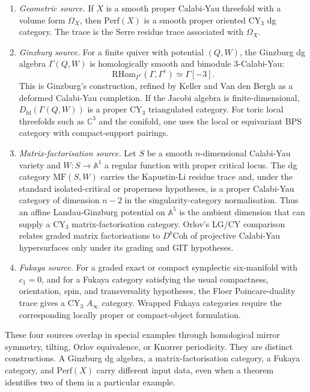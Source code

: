 \documentclass[11pt]{amsart}
\newcommand{\Perf}{\mathrm{Perf}}
\newcommand{\Dfd}{D_{\mathrm{fd}}}
\newcommand{\Db}{D^{b}}
\newcommand{\Coh}{\mathrm{Coh}}
\newcommand{\MF}{\mathrm{MF}}
\newcommand{\bA}{\mathbb{A}}
\newcommand{\bC}{\mathbb{C}}
\begin{document}
\begin{enumerate}
\item \emph{Geometric source.}
If $X$ is a smooth proper Calabi-Yau threefold with a volume form
$\Omega_X$, then $\Perf(X)$ is a smooth proper oriented CY$_3$ dg
category.  The trace is the Serre residue trace associated with
$\Omega_X$.

\item \emph{Ginzburg source.}
For a finite quiver with potential $(Q,W)$, the Ginzburg dg algebra
$\Gamma(Q,W)$ is homologically smooth and bimodule $3$-Calabi-Yau:
\[
  \mathrm{RHom}_{\Gamma^e}(\Gamma,\Gamma^e)\simeq\Gamma[-3].
\]
This is Ginzburg's construction, refined by Keller and Van den Bergh as
a deformed Calabi-Yau completion.  If the Jacobi algebra is
finite-dimensional, $\Dfd(\Gamma(Q,W))$ is a proper CY$_3$ triangulated
category.  For toric local threefolds such as $\bC^3$ and the conifold,
one uses the local or equivariant BPS category with compact-support
pairings.

\item \emph{Matrix-factorisation source.}
Let $S$ be a smooth $n$-dimensional Calabi-Yau variety and
$W\colon S\to\bA^1$ a regular function with proper critical locus.
The dg category $\MF(S,W)$ carries the Kapustin-Li residue trace and,
under the standard isolated-critical or properness hypotheses, is a
proper Calabi-Yau category of dimension $n-2$ in the singularity-category
normalisation.  Thus an affine Landau-Ginzburg potential on $\bA^5$
is the ambient dimension that can supply a CY$_3$ matrix-factorisation
category.  Orlov's LG/CY comparison relates graded matrix
factorisations to $\Db\Coh$ of projective Calabi-Yau hypersurfaces only
under its grading and GIT hypotheses.

\item \emph{Fukaya source.}
For a graded exact or compact symplectic six-manifold with
$c_1=0$, and for a Fukaya category satisfying the usual compactness,
orientation, spin, and transversality hypotheses, the Floer
Poincare-duality trace gives a CY$_3$ $A_\infty$ category.  Wrapped
Fukaya categories require the corresponding locally proper or
compact-object formulation.
\end{enumerate}

These four sources overlap in special examples through homological
mirror symmetry, tilting, Orlov equivalence, or Knorrer periodicity.
They are distinct constructions.  A Ginzburg dg algebra, a
matrix-factorisation category, a Fukaya category, and $\Perf(X)$ carry
different input data, even when a theorem identifies two of them in a
particular example.
\end{document}
